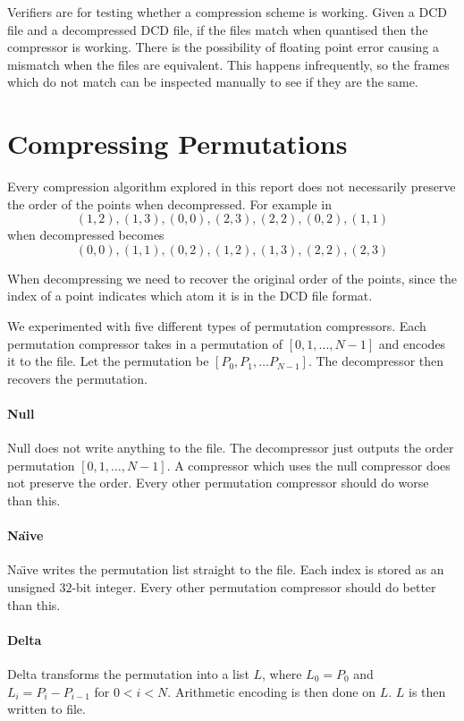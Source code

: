 \documentclass[a4paper]{report}
\begin{document}
Verifiers are for testing whether a compression scheme is working. Given a DCD
file and a decompressed DCD file, if the files match when quantised then the
compressor is working. There is the possibility of floating point error
causing a mismatch when the files are equivalent. This happens infrequently,
so the frames which do not match can be inspected manually to see if they are
the same.


\section{Compressing Permutations}
\label{sec:compr-perm}

Every compression algorithm explored in this report does not necessarily
preserve the order of the points when decompressed. For example in
\citep{devillers2000gci}
\[ (1, 2), (1, 3), (0, 0), (2, 3), (2, 2), (0, 2), (1, 1) \]
when decompressed becomes
\[ (0, 0), (1, 1), (0, 2), (1, 2), (1, 3), (2, 2), (2, 3) \]

When decompressing we need to recover the original order of the points, since
the index of a point indicates which atom it is in the DCD file format.

We experimented with five different types of permutation compressors. Each
permutation compressor takes in a permutation of $[0,1,\dots,N-1]$ and encodes
it to the file. Let the permutation be $[P_0, P_1, \dots P_{N-1}]$. The
decompressor then recovers the permutation.

\paragraph{Null}
Null does not write anything to the file. The decompressor just outputs the
order permutation $[0,1,\dots,N-1]$. A compressor which uses the null
compressor does not preserve the order. Every other permutation compressor
should do worse than this.

\paragraph{Na\"{\i}ve}
Na\"{\i}ve writes the permutation list straight to the file. Each index is
stored as an unsigned $32$-bit integer. Every other permutation compressor
should do better than this.

\paragraph{Delta}
Delta transforms the permutation into a list $L$, where $L_0 = P_0$ and $L_i =
P_i - P_{i-1}$ for $0 < i < N$. Arithmetic encoding is then done on $L$. $L$
is then written to file.
\end{document}
